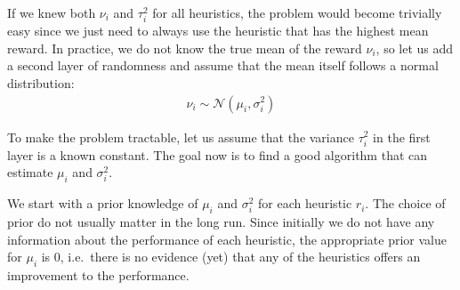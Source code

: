 \documentclass[fleqn,10pt,lineno]{wlpeerj} %
\newcommand{\Normal}{\mathcal{N}}
\begin{document}
If we knew both $\nu_i$ and $\tau_i^2$ for all heuristics, the problem would
become trivially easy since we just need to always use the heuristic that has
the highest mean reward. In practice, we do not know the true mean of the
reward $\nu_i$, so let us add a second layer of randomness and assume that
the mean itself follows a normal distribution:
	\begin{align}
        \nu_i \sim \Normal(\mu_i, \sigma_i^2)
    \end{align}

To make the problem tractable, let us assume that the variance $\tau_i^2$ in
the first layer is a known constant. The goal now is to find a good algorithm
that can estimate $\mu_i$ and $\sigma_i^2$.

We start with a prior knowledge of $\mu_i$ and $\sigma_i^2$ for each heuristic
$r_i$. The choice of prior do not usually matter in the long run. Since
initially we do not have any information about the performance of each
heuristic, the appropriate prior value for $\mu_i$ is $0$, i.e.\ there is no
evidence (yet) that any of the heuristics offers an improvement to the
performance.
\end{document}
